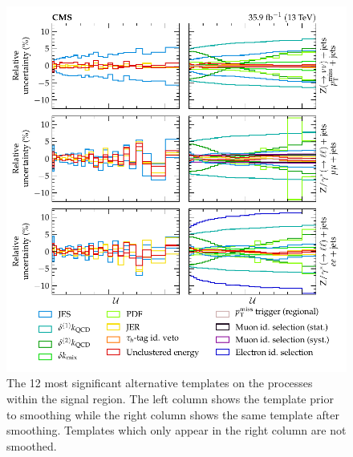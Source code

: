 \begin{figure}[htb]
    \centering
    \includegraphics{appendices/100_appendices/images/alt_templates_sig.pdf}
    \caption{
        The 12 most significant alternative templates on the \IVj processes within the signal region. The left column shows the template prior to smoothing while the right column shows the same template after smoothing. Templates which only appear in the right column are not smoothed.
    }
    \label{fig:alt_templates_sig}
\end{figure}